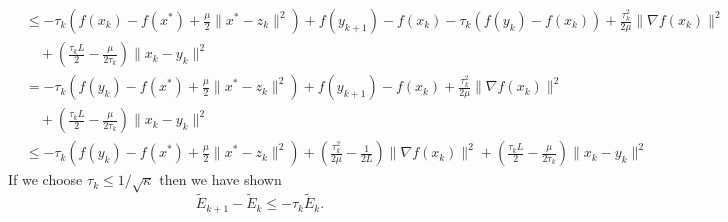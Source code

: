 \documentclass[11pt]{article}
\theoremstyle{plain}
\begin{document}
\begin{align*}
&\leq -\tau_k\left( f(x_k ) - f(x^\ast) + \frac{\mu}{2}\|x^\ast - z_k\|^2 \right) + f(y_{k+1}) - f(x_k) - \tau_k(f(y_k) - f(x_k))+ \frac{\tau_k^2}{2\mu}\|\nabla f(x_{k})\|^2 \\
&\quad + \left(\frac{\tau_kL}{2}-\frac{\mu}{2\tau_k}\right)\|x_k - y_k\|^2\\
&= -\tau_k\left( f(y_k ) - f(x^\ast) + \frac{\mu}{2}\|x^\ast - z_k\|^2 \right) + f(y_{k+1}) - f(x_k) + \frac{\tau_k^2}{2\mu}\|\nabla f(x_{k})\|^2 \\
&\quad+ \left(\frac{\tau_kL}{2}-\frac{\mu}{2\tau_k}\right)\|x_k - y_k\|^2\\
&\leq -\tau_k\left( f(y_k ) - f(x^\ast) + \frac{\mu}{2}\|x^\ast - z_k\|^2 \right) + \left(\frac{\tau_k^2}{2\mu}-\frac{1}{2L}\right)\|\nabla f(x_k)\|^2 + \left(\frac{\tau_kL}{2}-\frac{\mu}{2\tau_k}\right)\|x_k - y_k\|^2
\end{align*}
If we choose $\tau_k \leq 1/\sqrt{\kappa}$ then we have shown 
\begin{equation}
\tilde E_{k+1} - \tilde E_k \leq -\tau_k\tilde  E_k.
\end{equation}
\end{document}
